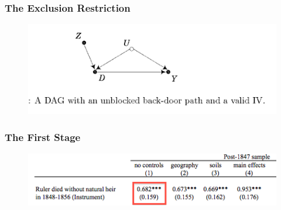 \documentclass{beamer}
\begin{document}
\begin{frame}
  \frametitle{The Exclusion Restriction}
  \begin{figure}[t]
    \centering
      \includegraphics[scale=.7]{DAG}
 \end{figure}
\end{frame}

\begin{frame}
  \frametitle{The First Stage}
  \begin{figure}[t]
    \centering
      \includegraphics[scale=.7]{first_stage}
 \end{figure}
\end{frame}
\end{document}
